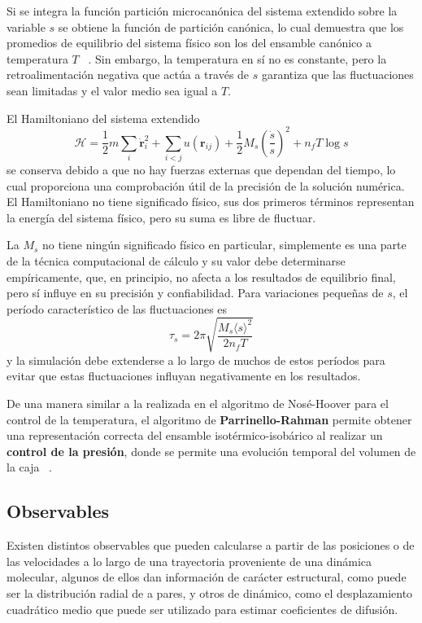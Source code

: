 Si se integra la función partición microcanónica del sistema extendido sobre la
variable $s$ se obtiene la función de partición canónica, lo cual demuestra que
los promedios de equilibrio del sistema físico son los del ensamble canónico a
temperatura $T$ ~\cite{nose1984a}. Sin embargo, la temperatura en sí no es 
constante, pero la retroalimentación negativa que actúa a través de $s$ garantiza
que las fluctuaciones sean limitadas y el valor medio sea igual a $T$.

El Hamiltoniano del sistema extendido
\begin{equation*}
\mathcal{H} = \frac{1}{2} m \sum_i \dot{\mathbf{r}}_i^2 + \sum_{i<j} u(\mathbf{r}_{ij}) + \frac{1}{2} M_s \left(\frac{\dot{s}}{s}\right)^2 + n_f T \log s
\end{equation*}
se conserva debido a que no hay fuerzas externas que dependan del tiempo, lo cual 
proporciona una comprobación útil de la precisión de la solución numérica. El 
Hamiltoniano no tiene significado físico, sus dos primeros términos representan 
la energía del sistema físico, pero su suma es libre de fluctuar.

La $M_s$ no tiene ningún significado físico en particular, simplemente es una 
parte de la técnica computacional de cálculo y su valor debe determinarse 
empíricamente, que, en principio, no afecta a los resultados de equilibrio final, 
pero sí influye en su precisión y confiabilidad. Para variaciones pequeñas de $s$, 
el período característico de las fluctuaciones es ~\cite{nose1984a}
\begin{equation*}
\tau_s = 2 \pi \sqrt{\frac{M_s \langle s \rangle^2}{2 n_f T}}
\end{equation*}
y la simulación debe extenderse a lo largo de muchos de estos períodos para evitar 
que estas fluctuaciones influyan negativamente en los resultados.

De una manera similar a la realizada en el algoritmo de Nosé-Hoover para el 
control de la temperatura, el algoritmo de \textbf{Parrinello-Rahman} permite
obtener una representación correcta del ensamble isotérmico-isobárico al 
realizar un \textbf{control de la presión}, donde se permite una evolución 
temporal del volumen de la caja ~\cite{parrinello-rahman}.


\subsection{Observables}\label{s:observables}

Existen distintos observables que pueden calcularse a partir de las posiciones o
de las velocidades a lo largo de una trayectoria proveniente de una dinámica 
molecular, algunos de ellos dan información de carácter estructural, como puede 
ser la distribución radial de a pares, y otros de dinámico, como el 
desplazamiento cuadrático medio que puede ser utilizado para estimar 
coeficientes de difusión.

